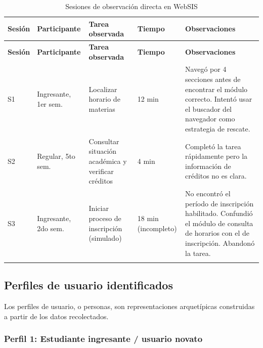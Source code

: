 \begingroup
\small
\setlength{\tabcolsep}{3pt}
\renewcommand{\arraystretch}{1.2}
\begin{longtable}{|p{1.2cm}|p{2.6cm}|p{3.4cm}|p{1.8cm}|p{4.4cm}|}
\hline
\textbf{Sesión} & \textbf{Participante} & \textbf{Tarea observada} & \textbf{Tiempo} & \textbf{Observaciones} \\
\hline
\endfirsthead

\hline
\textbf{Sesión} & \textbf{Participante} & \textbf{Tarea observada} & \textbf{Tiempo} & \textbf{Observaciones} \\
\hline
\endhead

S1 & Ingresante, 1er sem. & Localizar horario de materias & 12 min & Navegó por 4 secciones antes de encontrar el módulo correcto. Intentó usar el buscador del navegador como estrategia de rescate. \\
\hline
S2 & Regular, 5to sem. & Consultar situación académica y verificar créditos & 4 min & Completó la tarea rápidamente pero la información de créditos no es clara. \\
\hline
S3 & Ingresante, 2do sem. & Iniciar proceso de inscripción (simulado) & 18 min (incompleto) & No encontró el período de inscripción habilitado. Confundió el módulo de consulta de horarios con el de inscripción. Abandonó la tarea. \\
\hline
\caption{Sesiones de observación directa en WebSIS}\label{tab:observacion-directa}
\end{longtable}
\endgroup

\newpage
\subsection{Perfiles de usuario identificados}

Los perfiles de usuario, o personas, son representaciones arquetípicas construidas a partir de los datos recolectados.

\subsubsection{Perfil 1: Estudiante ingresante / usuario novato}

